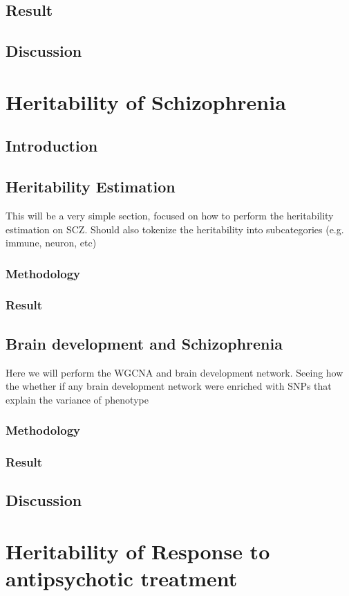 \documentclass{book}
\begin{document}
	\section{Result}
	\section{Discussion}
	
	\chapter{Heritability of Schizophrenia}
	\section{Introduction}
	\section{Heritability Estimation}
	This will be a very simple section, focused on how to perform the heritability estimation on \acrfull{SCZ}.
	Should also tokenize the heritability into subcategories (e.g. immune, neuron, etc)
	\subsection{Methodology}
	\subsection{Result}
	\section{Brain development and Schizophrenia}
	Here we will perform the WGCNA and brain development network.
	Seeing how the whether if any brain development network were enriched with SNPs that explain the variance of phenotype
	\subsection{Methodology}
	\subsection{Result}
	\section{Discussion}
	\chapter{Heritability of Response to antipsychotic treatment}
\end{document}
